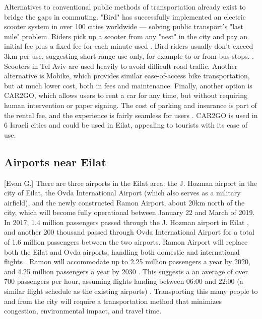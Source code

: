 \documentclass[12pt]{article}                         %
\begin{document}
Alternatives to conventional public methods of transportation already exist to bridge the gaps in commuting. "Bird" has successfully implemented an electric scooter system in over 100 cities worldwide --- solving public transport's "last mile" problem. Riders pick up a scooter from any "nest" in the city and pay an initial fee plus a fixed fee for each minute used \cite{MichaelRaz-Chaimovich2018BirdGlobes}. Bird riders usually don't exceed 3km per use, suggesting short-range use only, for example to or from bus stops. \cite{MichaelRaz-Chaimovich2018BirdGlobes}. Scooters in Tel Aviv are used heavily to avoid difficult road traffic. Another alternative is Mobike, which provides similar ease-of-access bike transportation, but at much lower cost, both in fees and maintenance. Finally, another option is CAR2GO, which allows users to rent a car for any time, but without requiring human intervention or paper signing. The cost of parking and insurance is part of the rental fee, and the experience is fairly seamless for users \cite{OrenDoriandMeiravMoran2018IsraeliHaaretz.com}. CAR2GO is used in 6 Israeli cities and could be used in Eilat, appealing to tourists with its ease of use.

\subsection{Airports near Eilat}[Evan G.]
There are three airports in the Eilat area: the J. Hozman airport in the city of Eilat, the Ovda International Airport (which also serves as a military airfield), and the newly constructed Ramon Airport, about 20km north of the city, which will become fully operational between January 22 and March of 2019. In 2017, 1.4 million passengers passed through the J. Hozman airport in Eilat \cite{IsraeliAirportAuthorityIsraeliAirports}, and another 200 thousand passed through Ovda International Airport \cite{IsraeliAirportAuthorityIsraeliAirports} for a total of 1.6 million passengers between the two airports. Ramon Airport will replace both the Eilat and Ovda airports, handling both domestic and international flights \cite{TimesofIsrealIsraelsOpen}. Ramon will accommodate up to 2.25 million passengers a year by 2020, and 4.25 million passengers a year by 2030 \cite{IsraeliAirportAuthorityIsraeliAirports}. This suggests a an average of over 700 passengers per hour, assuming flights landing between 06:00 and 22:00 (a similar flight schedule as the existing airports) \cite{IsraeliAirportAuthorityIsraeliAirports}. Transporting this many people to and from the city will require a transportation method that minimizes congestion, environmental impact, and travel time.
\end{document}
